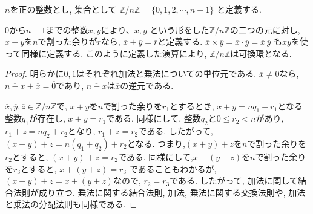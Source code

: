 \begin{tcolorbox}
	\begin{prp*}
		$n$を正の整数とし, 集合として
		$\mathbb{Z}/n\mathbb{Z}
		=\{\overline{0},\overline{1},\overline{2},\cdots,\overline{n-1}\}$
		と定義する.

		$0$から$n-1$までの整数$x,y$により、$\overline{x},\overline{y}$
		という形をした$\mathbb{Z}/n\mathbb{Z}$の二つの元に対し,
		$x+y$を$n$で割った余りが$r$なら,
		$\overline{x}+\overline{y}=\overline{r}$と定義する.
		$\overline{x}\times\overline{y}
		=\overline{x}\cdot\overline{y}=\overline{x}\,\overline{y}$
		も$xy$を使って同様に定義する. 
        このように定義した演算により, 
		$\mathbb{Z}/n\mathbb{Z}$は可換環となる. 
	\end{prp*}
\end{tcolorbox}

\begin{proof}
	明らかに$\overline{0},\overline{1}$はそれぞれ加法と乗法についての単位元である.
	$\overline{x}\neq \overline{0}$なら,
	$\overline{n-x}+\overline{x}=\overline{0}$であり,
	$\overline{n-x}$は$\overline{x}$の逆元である.

	$\overline{x},\overline{y},\overline{z}\in \mathbb{Z}/n\mathbb{Z}$で,
	$x+y$を$n$で割った余りを$r_1$とするとき,
	$x+y=nq_1+r_1$となる整数$q_1$が存在し, 
	$\overline{x}+\overline{y}=\overline{r_1}$である.
	同様にして, 整数$q_2$と$0\leq r_2 < n$があり,
	$r_1 + z=nq_2+r_2$となり,
	$\overline{r_1}+\overline{z}=\overline{r_2}$である. 
	したがって,$(x+y)+z=n(q_1+q_2)+r_2$となる.
	つまり,$(x+y)+z$を$n$で割った余りを$r_2$とすると,
	$(\overline{x}+\overline{y})+\overline{z}=\overline{r_2}$である.
	同様にして,$x+(y+z)$を$n$で割った余りを$r_3$とすると,
	$\overline{x}+(\overline{y}+\overline{z})=\overline{r_3}$
	であることもわかるが, $(x+y)+z=x+(y+z)$なので, $r_2=r_3$である.
	したがって, 加法に関して結合法則が成り立つ.
	乗法に関する結合法則, 加法, 乗法に関する交換法則や, 
	加法と乗法の分配法則も同様である.
\end{proof}
